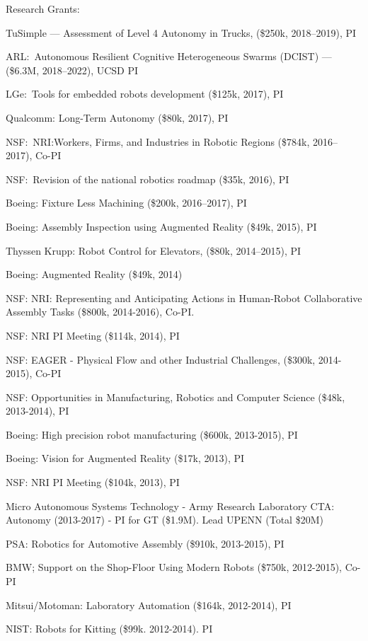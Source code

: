 \documentclass{article}
\begin{document}
\begin{cv}
\begin{cvlist}{Research Grants:}
		\item TuSimple --- Assessment of Level 4 Autonomy in Trucks,  (\$250k,
		2018--2019), PI
		\item ARL:\ Autonomous Resilient Cognitive Heterogeneous Swarms
		(DCIST) --- (\$6.3M, 2018--2022), UCSD PI
		\item LGe:\ Tools for embedded robots development (\$125k, 2017), PI
		\item Qualcomm: Long-Term Autonomy (\$80k, 2017), PI
		\item NSF:\ NRI:Workers, Firms, and Industries in Robotic Regions
		(\$784k, 2016--2017), Co-PI
		\item NSF:\ Revision of the national robotics roadmap (\$35k, 2016), PI
		\item Boeing: Fixture Less Machining (\$200k, 2016--2017), PI
		\item Boeing: Assembly Inspection using Augmented Reality (\$49k,
		2015), PI
		\item Thyssen Krupp: Robot Control for Elevators, (\$80k, 2014--2015), PI
		\item Boeing: Augmented Reality (\$49k, 2014)
		\item NSF: NRI: Representing and Anticipating Actions in Human-Robot
		Collaborative Assembly Tasks (\$800k, 2014-2016), Co-PI.
		\item NSF: NRI PI Meeting (\$114k, 2014), PI
		\item NSF: EAGER - Physical Flow and other Industrial Challenges,
		(\$300k, 2014-2015), Co-PI
		\item NSF: Opportunities in Manufacturing, Robotics and Computer Science
		(\$48k, 2013-2014), PI
		\item Boeing: High precision robot manufacturing (\$600k, 2013-2015), PI
		\item Boeing: Vision for Augmented Reality (\$17k, 2013), PI
		\item NSF: NRI PI Meeting (\$104k, 2013), PI
		\item Micro Autonomous Systems Technology - Army Research Laboratory
		CTA: Autonomy (2013-2017) - PI for GT (\$1.9M). Lead UPENN (Total
		\$20M) %
		\item PSA: Robotics for Automotive Assembly (\$910k, 2013-2015), PI
		\item BMW; Support on the Shop-Floor Using Modern Robots (\$750k,
		2012-2015), Co-PI
		\item Mitsui/Motoman: Laboratory Automation (\$164k, 2012-2014), PI
		\item NIST: Robots for Kitting (\$99k. 2012-2014). PI

\end{cvlist}
\end{cv}
\end{document}
